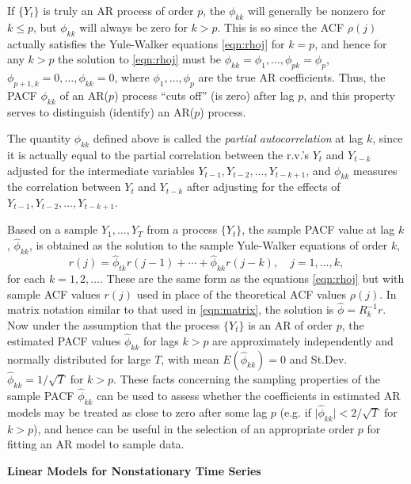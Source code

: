 If $\{ Y_t \}$ is truly an AR process of order $p$, the $\phi_{kk}$ will generally be nonzero for $k \leq p$, but $\phi_{kk}$ will always be zero for $k > p$. This is so since the ACF $\rho(j)$ actually satisfies the Yule-Walker equations \eqref{eqn:rhoj} for $k= p$, and hence for any $k > p$ the solution to \eqref{eqn:rhoj} must be $\phi_{kk}= \phi_1, \ldots, \phi_{pk}= \phi_p$, $\phi_{p+1,k} = 0, \ldots,\phi_{kk} = 0$, where $\phi_1, \ldots, \phi_p$ are the true AR coefficients. Thus, the PACF $\phi_{kk}$ of an AR($p$) process ``cuts off'' (is zero) after lag $p$, and this property serves to distinguish (identify) an AR($p$) process.


The quantity $\phi_{kk}$ defined above is called the \emph{partial autocorrelation} at lag $k$, since it is actually equal to the partial correlation between the r.v.'s $Y_t$ and $Y_{t-k}$ adjusted for the intermediate variables $Y_{t-1}, Y_{t-2}, \ldots, Y_{t-k+1}$, and $\phi_{kk}$ measures the correlation between $Y_t$ and $Y_{t-k}$ after adjusting for the effects of $Y_{t-1}, Y_{t-2}, \ldots, Y_{t-k+1}$.


Based on a sample $Y_1, \ldots, Y_T$ from a process $\{ Y_t \}$, the sample PACF value at lag $k$, $\hat{\phi}_{kk}$, is obtained as the solution to the sample Yule-Walker equations of order $k$,
	\begin{equation} \label{eqn:rjequation}
	r(j) = \hat{\phi}_{tk} r(j-1) + \cdots + \hat{\phi}_{kk} r(j-k), \quad j = 1, \ldots ,k,
	\end{equation}
for each $k= 1, 2, \ldots$. These are the same form as the equations \eqref{eqn:rhoj} but with sample ACF values $r(j)$ used in place of the theoretical ACF values $\rho(j)$. In matrix notation similar to that used in \eqref{eqn:matrix}, the solution is $\hat{\phi} = R_k^{-1} r$. Now under the assumption that the process $\{ Y_t \}$ is an AR of order $p$, the estimated PACF values $\hat{\phi}_{kk}$ for lags $k > p$ are approximately independently and normally distributed for large $T$, with mean $E(\hat{\phi}_{kk})= 0$ and St.Dev. $\hat{\phi}_{kk} = 1 / \sqrt{T}$ for $k > p$. These facts concerning the sampling properties of the sample PACF $\hat{\phi}_{kk}$ can be used to assess whether the coefficients in estimated AR models may be treated as close to zero after some lag $p$ (e.g. if $\lvert \hat{\phi}_{kk} \rvert < 2 / \sqrt{T}$ for $k > p$), and hence can be useful in the selection of an appropriate order $p$ for fitting an AR model to sample data. \twomedskip


\noindent\textbf{Linear Models for Nonstationary Time Series} \twomedskip


